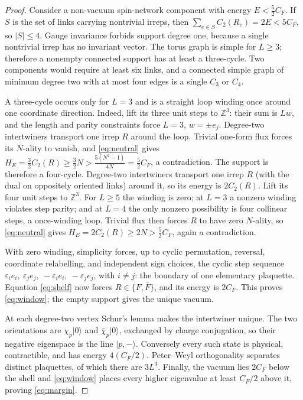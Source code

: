 \documentclass[11pt]{article}
\theoremstyle{plain}
\theoremstyle{definition}
\theoremstyle{remark}
\newcommand{\chk}[1]{}
\newcommand{\CF}{C_F}
\begin{document}
\begin{proof}
Consider a non-vacuum spin-network component with energy $E<\tfrac52\CF$. If
$S$ is the set of links carrying nontrivial irreps, then
$\sum_{e\in S}C_2(R_e)=2E<5\CF$, so $|S|\le4$. Gauge invariance forbids
support degree one, because a single nontrivial irrep has no invariant vector.
The torus graph is simple for $L\ge3$; therefore a nonempty connected support
has at least a three-cycle. Two components would require at least six links,
and a connected simple graph of minimum degree two with at most four edges is
a single $C_3$ or $C_4$.
\chk{the torus graph is simple, and the only short cycles are the L = 3 winding triangles}

A three-cycle occurs only for $L=3$ and is a straight loop winding once around
one coordinate direction. Indeed, lift its three unit steps to $\mathbb Z^3$:
their sum is $Lw$, and the length and parity constraints force $L=3$,
$w=\pm e_j$. Degree-two intertwiners transport one irrep $R$ around the loop.
Trivial one-form flux forces its $N$-ality to vanish, and \eqref{eq:neutral}
gives $H_E=\tfrac32C_2(R)\ge\tfrac32N>\tfrac{5(N^2-1)}{4N}=\tfrac52\CF$, a
contradiction. The support is therefore a four-cycle. Degree-two intertwiners
transport one irrep $R$ (with the dual on oppositely oriented links) around
it, so its energy is $2C_2(R)$. Lift its four unit steps to $\mathbb Z^3$. For
$L\ge5$ the winding is zero; at $L=3$ a nonzero winding violates step parity;
and at $L=4$ the only nonzero possibility is four collinear steps, a
once-winding loop. Trivial flux then forces $R$ to have zero $N$-ality, so
\eqref{eq:neutral} gives $H_E=2C_2(R)\ge2N>\tfrac52\CF$, again a
contradiction.

With zero winding, simplicity forces, up to cyclic permutation, reversal,
coordinate relabelling, and independent sign choices, the cyclic step sequence
$\varepsilon_ie_i,\ \varepsilon_je_j,\ -\varepsilon_ie_i,\ -\varepsilon_je_j$,
with $i\neq j$: the boundary of one elementary plaquette. Equation
\eqref{eq:shelf} now forces $R\in\{F,\bar F\}$, and its energy is $2\CF$. This
proves \eqref{eq:window}; the empty support gives the unique vacuum.
\chk{every 4-cycle is an elementary face, except exactly the 3L\^{}2 straight winding loops at L = 4}

At each degree-two vertex Schur's lemma makes the intertwiner unique. The two
orientations are $\chi_p|0\rangle$ and $\bar\chi_p|0\rangle$, exchanged by
charge conjugation, so their negative eigenspace is the line $|p,-\rangle$.
Conversely every such state is physical, contractible, and has energy
$4(\CF/2)$. Peter--Weyl orthogonality separates distinct plaquettes, of which
there are $3L^3$. Finally, the vacuum lies $2\CF$ below the shell and
\eqref{eq:window} places every higher eigenvalue at least $\CF/2$ above it,
proving \eqref{eq:margin}.
\end{proof}
\end{document}
